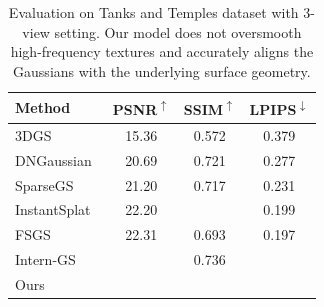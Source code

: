 \begin{table}[ht!]
    \centering
    \footnotesize
    \setlength{\tabcolsep}{2pt}
    \begin{tabular}{lccc}
    \toprule
     Method & PSNR\textsuperscript{$\uparrow$} & SSIM\textsuperscript{$\uparrow$} & LPIPS\textsuperscript{$\downarrow$}\\
    \midrule
 3DGS~\cite{3dgs2023} & 15.36 & 0.572 & 0.379 \\
 DNGaussian~\cite{DNGaussian} & 20.69 & 0.721 & 0.277 \\
 SparseGS~\cite{SparseGS} & 21.20 & 0.717 & 0.231 \\
 InstantSplat~\cite{InstantSplat} & 22.20 & \cellcolor{tab_color!30}{0.743} & 0.199 \\
 FSGS~\cite{fsgs}&\cellcolor{tab_color!10}22.31& 0.693&\cellcolor{tab_color!10}0.197\\
 Intern-GS~\cite{InternGS} & \cellcolor{tab_color!30}{22.67} & \cellcolor{tab_color!10}0.736 & \cellcolor{tab_color!30}{0.191} \\
 Ours & \cellcolor{tab_color!50}{22.87} & \cellcolor{tab_color!50}{0.764} & \cellcolor{tab_color!50}{0.189}\\
    \bottomrule
    \end{tabular}
    \caption{Evaluation on Tanks and Temples dataset with 3-view setting. Our model does not oversmooth high-frequency textures and accurately aligns the Gaussians with the underlying surface geometry.}
    \label{tab:evaluation_tat}
\end{table}